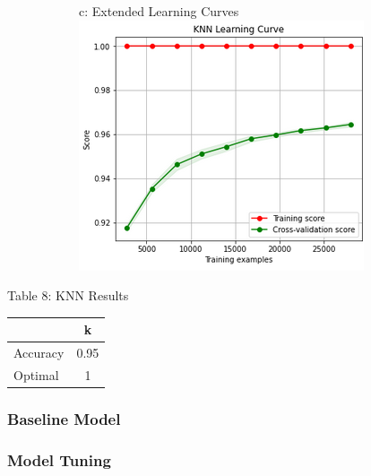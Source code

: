 \documentclass{article}
\begin{document}
\begin{figure}
\begin{subfigure}{.34\textwidth}
	\end{subfigure}
	\begin{subfigure}{.34\textwidth}
		\centering
		c: Extended Learning Curves\\
		\includegraphics[width=\linewidth]{mnist_knn_learning2.png}
		
	\end{subfigure}
	\label{fig:test}
\end{figure}

\begin{table}
	
	\centering
	Table 8: KNN Results \\
	\begin{tabular}{ l c  }
		\hline
		& k \\
		\hline
		Accuracy & 0.95 \\
		Optimal & 1  \\
		
		
		\hline 
	\end{tabular}
\end{table}

\subsubsection*{Baseline Model}
\subsubsection*{Model Tuning}
\end{document}
